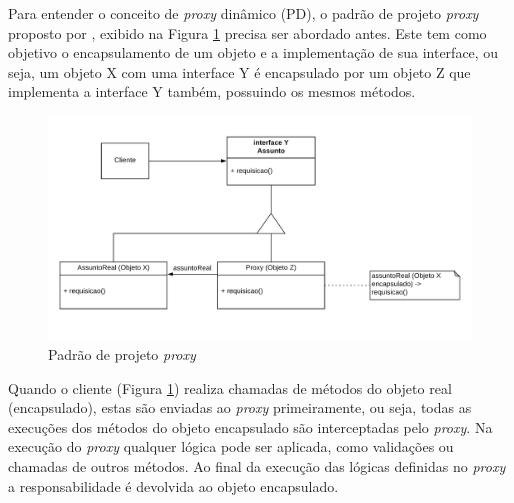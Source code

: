 \par Para entender o conceito de \textit{proxy} dinâmico (PD), o padrão de projeto \textit{proxy} proposto por , exibido na Figura \ref{fig:proxy-pattern} precisa ser abordado antes. Este tem como objetivo o encapsulamento de um objeto e a implementação de sua interface, ou seja, um objeto X com uma interface Y é encapsulado por um objeto Z que implementa a interface Y também, possuindo os mesmos métodos.

\begin{figure}[H]
    \centering
    \includegraphics[scale=0.2]{src/imagens/cap2/proxy-pattern-criado.png}
    \caption{Padrão de projeto \textit{proxy}}
    \label{fig:proxy-pattern}
\end{figure}

\par Quando o cliente (Figura \ref{fig:proxy-pattern}) realiza chamadas de métodos do objeto real (encapsulado), estas são enviadas ao \textit{proxy} primeiramente, 
ou seja, todas as execuções dos métodos do objeto encapsulado são interceptadas pelo \textit{proxy}. Na execução do \textit{proxy} qualquer lógica pode ser aplicada, como validações ou chamadas de outros métodos. Ao final da execução das lógicas definidas no \textit{proxy} a responsabilidade é devolvida ao objeto encapsulado.

